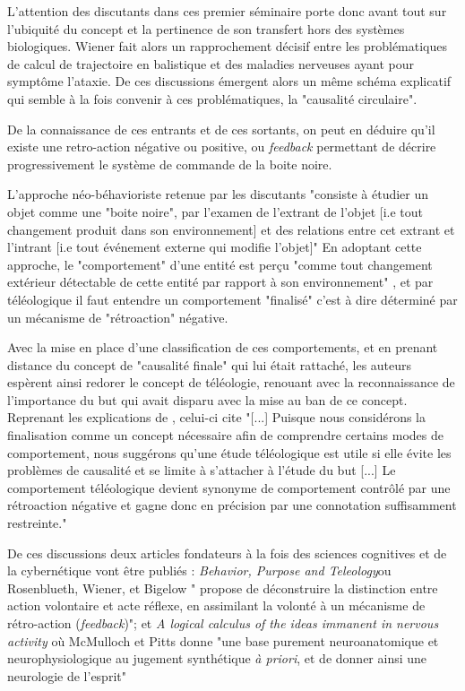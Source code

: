 L'attention des discutants dans ces premier séminaire porte donc avant tout sur l'ubiquité du concept et la pertinence de son transfert hors des systèmes biologiques. Wiener fait alors un rapprochement décisif entre les problématiques de calcul de trajectoire en balistique et des maladies nerveuses ayant pour symptôme l'ataxie. De ces discussions émergent alors un même schéma explicatif qui semble à la fois convenir à ces problématiques, la "causalité circulaire". \autocite[774]{Pouvreau2013, Rosnay1975}

De la connaissance de ces entrants et de ces sortants, on peut en déduire qu'il existe une retro-action négative ou positive, ou \textit{feedback} permettant de décrire progressivement le système de commande de la boite noire.


L'approche néo-béhavioriste retenue par les discutants "consiste à étudier un objet comme une "boite noire", par l'examen de l'extrant de l'objet [i.e tout changement produit dans son environnement] et des relations entre cet extrant et l'intrant [i.e tout événement externe qui modifie l'objet]" \autocite{Pouvreau2013} En adoptant cette approche, le "comportement" d'une entité est perçu "comme tout changement extérieur détectable de cette entité par rapport à son environnement" , et par téléologique il faut entendre un comportement "finalisé" c'est à dire déterminé par un mécanisme de "rétroaction" négative.

Avec la mise en place d'une classification de ces comportements, et en prenant distance du concept de "causalité finale" qui lui était rattaché, les auteurs espèrent ainsi redorer le concept de téléologie, renouant avec la reconnaissance de l'importance du but qui avait disparu avec la mise au ban de ce concept. Reprenant les explications de \autocite[776]{Pouvreau2013}, celui-ci cite \autocite[23-24]{Rosenblueth1943} "[...] Puisque nous considérons la finalisation comme un concept nécessaire afin de comprendre certains modes de comportement, nous suggérons qu'une étude téléologique est utile si elle évite les problèmes de causalité et se limite à s'attacher à l'étude du but [...] Le comportement téléologique devient synonyme de comportement contrôlé par une rétroaction négative et gagne donc en précision par une connotation suffisamment restreinte."

De ces discussions deux articles fondateurs à la fois des sciences cognitives \autocite[23]{Dupuy2000} et de la cybernétique vont être publiés : \textit{Behavior, Purpose and Teleology}ou Rosenblueth, Wiener, et Bigelow " propose de déconstruire la distinction entre action volontaire et acte réflexe, en assimilant la volonté à un mécanisme de rétro-action (\textit{feedback})"; et \textit{A logical calculus of the ideas immanent in nervous activity} où McMulloch et Pitts donne "une base purement neuroanatomique et neurophysiologique au jugement synthétique \textit{à priori}, et de donner ainsi une neurologie de l'esprit"

